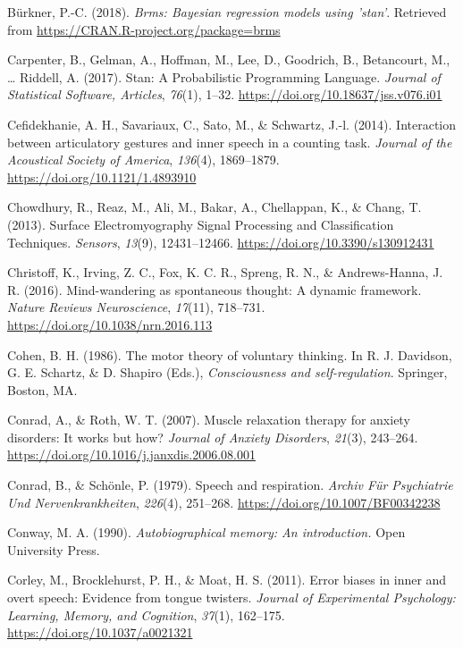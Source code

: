 \documentclass[a4paper,12pt,twoside,openright,oldfontcommands]{memoir}
\begin{document}
\hypertarget{ref-R-brms}{}
Bürkner, P.-C. (2018). \emph{Brms: Bayesian regression models using
'stan'}. Retrieved from \url{https://CRAN.R-project.org/package=brms}

\hypertarget{ref-carpenter_stan:_2017}{}
Carpenter, B., Gelman, A., Hoffman, M., Lee, D., Goodrich, B.,
Betancourt, M., \ldots{} Riddell, A. (2017). Stan: A Probabilistic
Programming Language. \emph{Journal of Statistical Software, Articles},
\emph{76}(1), 1--32. \url{https://doi.org/10.18637/jss.v076.i01}

\hypertarget{ref-cefidekhanie_interaction_2014}{}
Cefidekhanie, A. H., Savariaux, C., Sato, M., \& Schwartz, J.-l. (2014).
Interaction between articulatory gestures and inner speech in a counting
task. \emph{Journal of the Acoustical Society of America},
\emph{136}(4), 1869--1879. \url{https://doi.org/10.1121/1.4893910}

\hypertarget{ref-chowdhury_surface_2013}{}
Chowdhury, R., Reaz, M., Ali, M., Bakar, A., Chellappan, K., \& Chang,
T. (2013). Surface Electromyography Signal Processing and Classification
Techniques. \emph{Sensors}, \emph{13}(9), 12431--12466.
\url{https://doi.org/10.3390/s130912431}

\hypertarget{ref-christoff_mind-wandering_2016}{}
Christoff, K., Irving, Z. C., Fox, K. C. R., Spreng, R. N., \&
Andrews-Hanna, J. R. (2016). Mind-wandering as spontaneous thought: A
dynamic framework. \emph{Nature Reviews Neuroscience}, \emph{17}(11),
718--731. \url{https://doi.org/10.1038/nrn.2016.113}

\hypertarget{ref-cohen_motor_1986}{}
Cohen, B. H. (1986). The motor theory of voluntary thinking. In R. J.
Davidson, G. E. Schartz, \& D. Shapiro (Eds.), \emph{Consciousness and
self-regulation}. Springer, Boston, MA.

\hypertarget{ref-conrad_muscle_2007}{}
Conrad, A., \& Roth, W. T. (2007). Muscle relaxation therapy for anxiety
disorders: It works but how? \emph{Journal of Anxiety Disorders},
\emph{21}(3), 243--264.
\url{https://doi.org/10.1016/j.janxdis.2006.08.001}

\hypertarget{ref-conrad_speech_1979}{}
Conrad, B., \& Schönle, P. (1979). Speech and respiration. \emph{Archiv
Für Psychiatrie Und Nervenkrankheiten}, \emph{226}(4), 251--268.
\url{https://doi.org/10.1007/BF00342238}

\hypertarget{ref-conway_autobiographical_1990}{}
Conway, M. A. (1990). \emph{Autobiographical memory: An introduction.}
Open University Press.

\hypertarget{ref-corley_error_2011}{}
Corley, M., Brocklehurst, P. H., \& Moat, H. S. (2011). Error biases in
inner and overt speech: Evidence from tongue twisters. \emph{Journal of
Experimental Psychology: Learning, Memory, and Cognition}, \emph{37}(1),
162--175. \url{https://doi.org/10.1037/a0021321}
\end{document}
